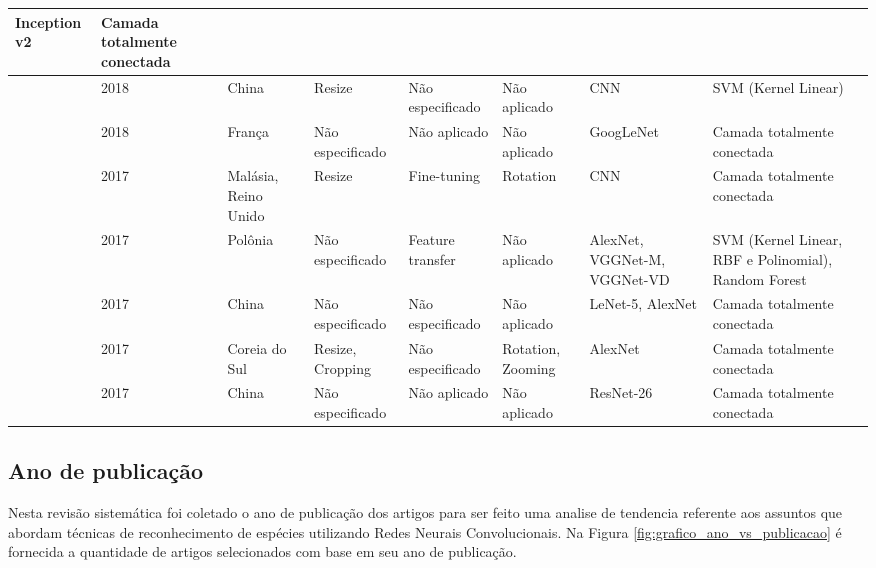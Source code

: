 \documentclass[
	12pt,				%
	oneside,			%
	a4paper,			%
	english,			%
	brazil				%
	]{abntex2ppgsi}
\begin{document}
\begin{landscape}
\begin{OnehalfSpacing}
\begin{footnotesize}
\begin{longtable}{|p{2.3cm}|p{1.3cm}|p{2cm}|p{2.6cm}|p{2.4cm}|p{4.3cm}|p{4.3cm}|p{2.5cm}|}
  Inception v2 &
  Camada totalmente conectada \\ \hline
\cite{zhu2018plant} &
  2018 &
  China &
  Resize &
  Não especificado &
  Não aplicado &
  CNN &
  SVM (Kernel Linear) \\ \hline
\cite{villon2018deep} &
  2018 &
  França &
  Não especificado &
  Não aplicado &
  Não aplicado &
  GoogLeNet &
  Camada totalmente conectada \\ \hline
\cite{lee2017deep} &
  2017 &
  Malásia, Reino Unido &
  Resize &
  Fine-tuning &
  Rotation &
  CNN &
  Camada totalmente conectada \\ \hline
\cite{zielinski2017deep} &
  2017 &
  Polônia &
  Não especificado &
  Feature transfer &
  Não aplicado &
  AlexNet, VGGNet-M, VGGNet-VD &
  SVM (Kernel Linear, RBF e Polinomial), Random Forest \\ \hline
\cite{wang2017crop} &
  2017 &
  China &
  Não especificado &
  Não especificado &
  Não aplicado &
  LeNet-5, AlexNet &
  Camada totalmente conectada \\ \hline
\cite{lim2017performance} &
  2017 &
  Coreia do Sul &
  Resize, Cropping &
  Não especificado &
  Rotation, Zooming &
  AlexNet &
  Camada totalmente conectada \\ \hline
\cite{sun2017deep} &
  2017 &
  China &
  Não especificado &
  Não aplicado &
  Não aplicado &
  ResNet-26 &
  Camada totalmente conectada \\ \hline
  
\end{longtable}
\end{footnotesize}
\end{OnehalfSpacing}
\end{landscape}

\subsection{Ano de publicação}

Nesta revisão sistemática foi coletado o ano de publicação dos artigos para ser feito uma analise de tendencia referente aos assuntos que abordam técnicas de reconhecimento de espécies utilizando Redes Neurais Convolucionais. Na Figura \ref{fig:grafico_ano_vs_publicacao} é fornecida a quantidade de artigos selecionados com base em seu ano de publicação.
\end{document}
